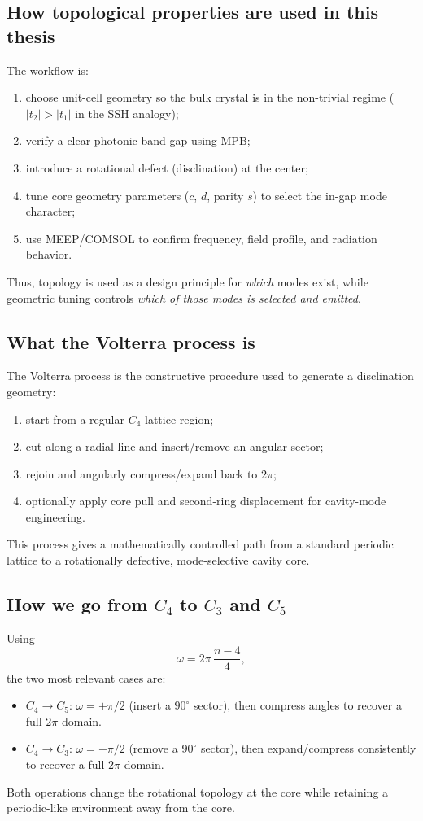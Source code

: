 \documentclass[12pt,a4paper,oneside]{book}
\theoremstyle{plain}
\theoremstyle{definition}
\theoremstyle{remark}
\begin{document}
\subsection{How topological properties are used in this thesis}

The workflow is:
\begin{enumerate}
  \item choose unit-cell geometry so the bulk crystal is in the non-trivial regime ($|t_2|>|t_1|$ in the SSH analogy);
  \item verify a clear photonic band gap using MPB;
  \item introduce a rotational defect (disclination) at the center;
  \item tune core geometry parameters ($c$, $d$, parity $s$) to select the in-gap mode character;
  \item use MEEP/COMSOL to confirm frequency, field profile, and radiation behavior.
\end{enumerate}
Thus, topology is used as a design principle for \emph{which} modes exist, while geometric tuning controls \emph{which of those modes is selected and emitted}.

\subsection{What the Volterra process is}

The Volterra process is the constructive procedure used to generate a disclination geometry:
\begin{enumerate}
  \item start from a regular $C_4$ lattice region;
  \item cut along a radial line and insert/remove an angular sector;
  \item rejoin and angularly compress/expand back to $2\pi$;
  \item optionally apply core pull and second-ring displacement for cavity-mode engineering.
\end{enumerate}
This process gives a mathematically controlled path from a standard periodic lattice to a rotationally defective, mode-selective cavity core.

\subsection{How we go from $C_4$ to $C_3$ and $C_5$}

Using
\begin{equation}
  \omega = 2\pi\,\frac{n-4}{4},
\end{equation}
the two most relevant cases are:
\begin{itemize}
  \item $C_4 \rightarrow C_5$: $\omega=+\pi/2$ (insert a $90^\circ$ sector), then compress angles to recover a full $2\pi$ domain.
  \item $C_4 \rightarrow C_3$: $\omega=-\pi/2$ (remove a $90^\circ$ sector), then expand/compress consistently to recover a full $2\pi$ domain.
\end{itemize}
Both operations change the rotational topology at the core while retaining a periodic-like environment away from the core.
\end{document}

